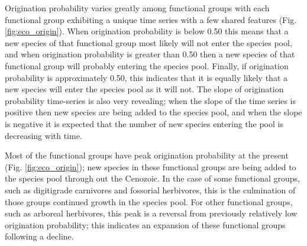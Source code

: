\documentclass[12pt,letterpaper]{article}
\begin{document}
Origination probability varies greatly among functional groups with each functional group exhibiting a unique time series with a few shared features (Fig. \ref{fig:eco_origin}). When origination probability is below 0.50 this means that a new species of that functional group most likely will not enter the species pool, and when origination probability is greater than 0.50 then a new species of that functional group will probably entering the species pool. Finally, if origination probability is approximately 0.50, this indicates that it is equally likely that a new species will enter the species pool as it will not. The slope of origination probability time-series is also very revealing; when the slope of the time series is positive then new species are being added to the species pool, and when the slope is negative it is expected that the number of new species entering the pool is decreasing with time.

Most of the functional groups have peak origination probability at the present (Fig. \ref{fig:eco_origin}); new species in these functional groups are being added to the species pool through out the Cenozoic. In the case of some functional groups,  such as digitigrade carnivores and fossorial herbivores, this is the culmination of those groups continued growth in the species pool. For other functional groups, such as arboreal herbivores, this peak is a reversal from previously relatively low origination probability; this indicates an expansion of these functional groups following a decline.
\end{document}
